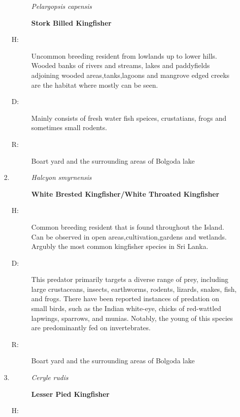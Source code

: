 \begin{itemize}
\begin{enumerate}
\begin{description}%
\item[]%
\textit{Pelargopsis capensis}%
\item[]%
\textbf{Stork Billed Kingfisher}%
\end{description}%
\begin{description}%
\item[H: ]%
Uncommon breeding resident from lowlands up to lower hills. Wooded banks of rivers and streams, lakes and paddyfields adjoining wooded areas,tanks,lagoons and mangrove edged creeks are the habitat where mostly can be seen. %
\item[D: ]%
Mainly consists of fresh water fish speices, crustatians, frogs and sometimes small rodents.%
\item[R: ]%
Boart yard and the surrounding areas of Bolgoda lake%
\end{description}%
\item%
\begin{description}%
\item[]%
\textit{Halcyon smyrnensis}%
\item[]%
\textbf{White Brested Kingfisher/White Throated Kingfisher}%
\end{description}%
\begin{description}%
\item[H: ]%
Common breeding resident that is found throughout the Island. Can be observed in open areas,cultivation,gardens and wetlands. Argubly the most common kingfisher species in Sri Lanka.%
\item[D: ]%
This predator primarily targets a diverse range of prey, including large crustaceans, insects, earthworms, rodents, lizards, snakes, fish, and frogs. There have been reported instances of predation on small birds, such as the Indian white{-}eye, chicks of red{-}wattled lapwings, sparrows, and munias. Notably, the young of this species are predominantly fed on invertebrates.%
\item[R: ]%
Boart yard and the surrounding areas of Bolgoda lake%
\end{description}%
\item%
\begin{description}%
\item[]%
\textit{Ceryle rudis}%
\item[]%
\textbf{Lesser Pied Kingfisher}%
\end{description}%
\begin{description}%
\item[H: ]%

\end{description}
\end{enumerate}
\end{itemize}
